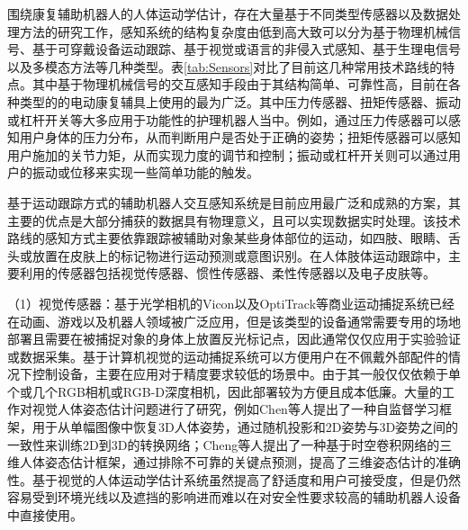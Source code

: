 围绕康复辅助机器人的人体运动学估计，存在大量基于不同类型传感器以及数据处理方法的研究工作，感知系统的结构复杂度由低到高大致可以分为基于物理机械信号、基于可穿戴设备运动跟踪、基于视觉或语言的非侵入式感知、基于生理电信号以及多模态方法等几种类型。表\ref{tab:Sensors}对比了目前这几种常用技术路线的特点。其中基于物理机械信号的交互感知手段由于其结构简单、可靠性高，目前在各种类型的的电动康复辅具上使用的最为广泛。其中压力传感器、扭矩传感器、振动或杠杆开关等大多应用于功能性的护理机器人当中。例如，通过压力传感器可以感知用户身体的压力分布，从而判断用户是否处于正确的姿势\cite{sharmaPhysicalHumanRobotInteraction2022}；扭矩传感器可以感知用户施加的关节力矩，从而实现力度的调节和控制\cite{chenDevelopmentWearableUpper2022}；振动或杠杆开关则可以通过用户的振动或位移来实现一些简单功能的触发。

基于运动跟踪方式的辅助机器人交互感知系统是目前应用最广泛和成熟的方案，其主要的优点是大部分捕获的数据具有物理意义，且可以实现数据实时处理\cite{scardovelliDesignEvaluationPeripheral2015,lancioniPersonsMultipleDisabilities2013}。该技术路线的感知方式主要依靠跟踪被辅助对象某些身体部位的运动，如四肢、眼睛、舌头或放置在皮肤上的标记物进行运动预测或意图识别。在人体肢体运动跟踪中，主要利用的传感器包括视觉传感器\cite{bianFacialPositionExpressionBased2016b}、惯性传感器\cite{tongLSTMBasedLowerLimbs2020,liuNovelMethodParkinson2019,liuDesignWearableWireless2018}、柔性传感器以及电子皮肤\cite{kimDeepFullBodyMotion2019,leePrintableSkinAdhesive2016,jinSoftSensingShirt2020,contreras-gonzalezEfficientUpperLimb2020,samper-escuderoEfficientMultiaxialShoulderMotion2020}等。

（1）视觉传感器：基于光学相机的Vicon\cite{ViconAwardWinning}以及OptiTrack\cite{MotionCaptureSystems}等商业运动捕捉系统已经在动画、游戏以及机器人领域被广泛应用，但是该类型的设备通常需要专用的场地部署且需要在被捕捉对象的身体上放置反光标记点，因此通常仅仅应用于实验验证或数据采集。基于计算机视觉的运动捕捉系统可以方便用户在不佩戴外部配件的情况下控制设备\cite{wangDeep3DHuman2021}，主要在应用对于精度要求较低的场景中。由于其一般仅仅依赖于单个或几个RGB相机或RGB-D深度相机，因此部署较为方便且成本低廉。大量的工作对视觉人体姿态估计问题进行了研究，例如Chen等人\cite{chenUnsupervised3DPose2019}提出了一种自监督学习框架，用于从单幅图像中恢复3D人体姿势，通过随机投影和2D姿势与3D姿势之间的一致性来训练2D到3D的转换网络；Cheng等人\cite{chengOcclusionAwareNetworks3D2019}提出了一种基于时空卷积网络的三维人体姿态估计框架，通过排除不可靠的关键点预测，提高了三维姿态估计的准确性。基于视觉的人体运动学估计系统虽然提高了舒适度和用户可接受度，但是仍然容易受到环境光线以及遮挡的影响\cite{scardovelliDesignEvaluationPeripheral2015}进而难以在对安全性要求较高的辅助机器人设备中直接使用。

